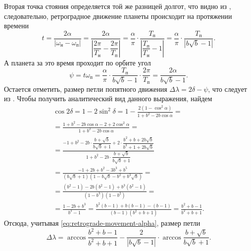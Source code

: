 Вторая точка стояния определяется той же разницей долгот, что видно из , следовательно, ретроградное движение планеты происходит на протяжении времени
\begin{equation*}
    t 
        = \frac{2 \alpha}{|\omega_\text{н} - \omega_\text{п}|} 
        = \frac{2 \alpha}{\left|\dfrac{2\pi}{T_\text{н}} - \dfrac{2\pi}{T_\text{п}} \right|} 
        = \frac{\alpha}{\pi}\cdot \frac{T_\text{п}}{\left|\dfrac{T_\text{п}}{T_\text{н}} - 1\right|} 
        = \frac{\alpha}{\pi}\cdot \frac{T_\text{п}}{\left| b \sqrt{b} - 1 \right|}.
\end{equation*}
А планета за это время проходит по орбите угол
\begin{equation*}
    \psi = t \omega_\text{п} = \frac{\alpha}{\pi} \cdot \frac{T_\text{п}}{b \sqrt{b} - 1} \cdot \frac{2\pi}{T_\text{п}} = \frac{2\alpha}{b \sqrt{b} - 1}.
\end{equation*}
Остается отметить, размер петли попятного движения $\Delta \lambda = 2\delta - \psi$, что следует из . Чтобы получить аналитический вид данного выражения, найдем
\begin{multline*}
    \cos 2 \delta 
        = 1 - 2 \sin^2 \delta 
        = 1 - \frac{2(1 - \cos^2 \alpha)}{1 + b^2 - 2b \cos \alpha} = \\
        =\frac{1 + b^2 - 2 b \cos \alpha - 2 + 2 \cos^2 \alpha}{1 + b^2 - 2b\cos \alpha} =\\
        = \frac{-1 + b^2 - 2b \cdot \dfrac{b + \sqrt{b}}{b \sqrt{b} + 1} + 2 \cdot \dfrac{b^2 + b +2b\sqrt{b}}{b^3 + 1 + 2 b \sqrt{b}}}{1 + b^2 - 2b \cdot \dfrac{b + \sqrt{b}}{b \sqrt{b} + 1}}\\
        = \frac{-1 + 2b + b^2 - 3b^3 + b^5}{\left(b \sqrt{b} + 1\right) \left(1 - b \sqrt{b} - b^2 + b^3 \sqrt{b}\right)} = \\
        = \frac{(b^2 - 1) - 2b(b^2 - 1) + b^3(b^2 - 1)}{(1 - b^3)(1 - b^2)} = \\
        = \frac{1 - 2b + b^3}{b^3 - 1} = \frac{b^2(b-1) + b(b-1) - (b - 1)}{\left(b-1\right)\left(b^2 + b + 1\right)} = \frac{b^2 + b - 1}{b^2 + b + 1}.
\end{multline*} 
Отсюда, учитывая \eqref{eq:retrograde-movement-alpha}, размер петли
\begin{equation}
    \Delta\lambda = \arccos \frac{b^2 + b - 1}{b^2 + b + 1} - \frac{2}{\left|b\sqrt{b} - 1 \right|} \cdot \arccos \frac{b + \sqrt{b}}{b \sqrt{b} + 1}.
\end{equation}

